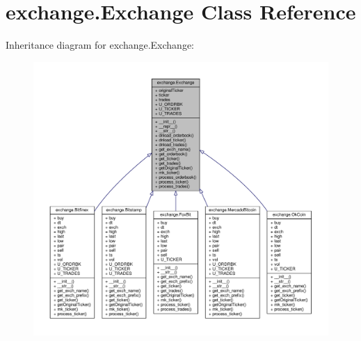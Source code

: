 \hypertarget{classexchange_1_1_exchange}{}\section{exchange.\+Exchange Class Reference}
\label{classexchange_1_1_exchange}


Inheritance diagram for exchange.\+Exchange\+:\nopagebreak
\begin{figure}[H]
\begin{center}
\leavevmode
\includegraphics[width=350pt]{classexchange_1_1_exchange__inherit__graph}
\end{center}
\end{figure}


